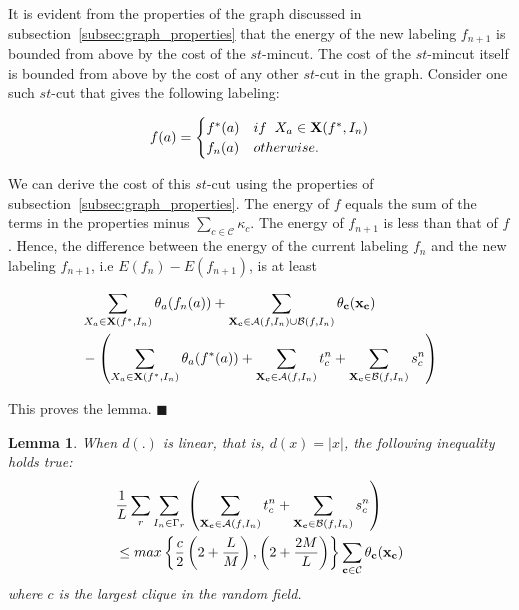 \documentclass[10pt,letterpaper]{article}
\newtheorem{lemma}{Lemma}
\begin{document}
It is evident from the properties of the graph discussed in subsection~\ref{subsec:graph_properties} that the energy of the new labeling $f_{n+1}$ is bounded from above by the cost of the $st$-mincut. The cost of the $st$-mincut itself is bounded from above by the cost of any other $st$-cut in the graph. Consider one such $st$-cut that gives the following labeling:

\begin{align*}
 f(a) = 
	\begin{cases}
		f^*(a) & if \hspace{2mm} X_a \in \mathbf{X}(f^*, I_n) \\
		f_n(a) & otherwise.
	\end{cases}
\end{align*}

We can derive the cost of this $st$-cut using the properties of subsection~\ref{subsec:graph_properties}. The energy of $f$ equals the sum of the terms in the properties minus $\sum_{c \in \mathcal{C}} \kappa_{c}$. The energy of $f_{n+1}$ is less than that of $f$. Hence, the difference between the energy of the current labeling $f_n$ and the new labeling $f_{n+1}$, i.e $E(f_n) - E(f_{n+1})$, is at least

\begin{align*}
	\begin{split}
		& \sum_{X_a \in {\bf X}(f^*, I_{n})} \theta_{a}(f_n(a)) + \sum_{{\bf X_c} \in \mathcal{A}\mathit(f, I_n) \cup \mathcal{B}\mathit(f, I_n)} \theta_{\bf c}({\bf x_c}) \\
		&	  - \left( \sum_{X_a \in {\bf X}(f^*, I_{n})} \theta_{a}(f^*(a)) + \sum_{{\bf X_c} \in \mathcal{A}\mathit(f, I_n)} t_c^n 
	 +  \sum_{{\bf X_c} \in \mathcal{B}\mathit(f, I_n)} s_c^n \right) 
	 \end{split}
 \end{align*}

 This proves the lemma. \hspace{6mm} $\blacksquare$ 
\begin{lemma}
When $d(.)$ is linear, that is, $d(x) = |x|$, the following inequality holds true:
\begin{equation}
\begin{split}
& \frac{1}{L}\sum_{r}\sum_{I_n \in \Gamma_r}\left(\sum_{{\bf X_c} \in \mathcal{A}\mathit(f, I_n)} t_c^n + \sum_{{\bf X_c} \in \mathcal{B}\mathit(f, I_n)} s_c^n \right) \\
& \leq  max \left\{ \frac{c}{2}\left(2 + \frac{L}{M}\right), \left(2 + \frac{2M}{L}\right) \right\} \sum_{{\bf c} \in \mathcal{C}} \theta_{\bf c}(\bf {x_c})
\end{split}
\end{equation}
where $\mathit{c}$ is the largest clique in the random field.
\label{lemma:linearIneq}
\end{lemma}
\end{document}
